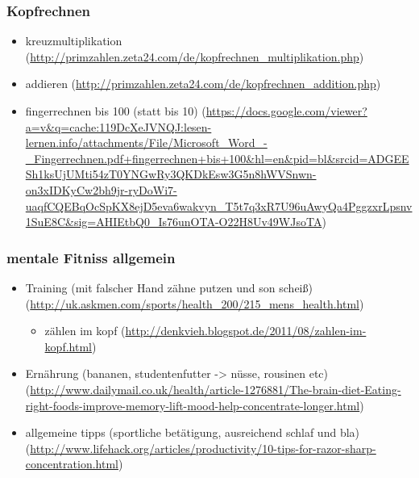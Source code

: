 \documentclass[11pt]{article}
\begin{document}
\subsubsection{Kopfrechnen}
\label{sec-2-3-5}

\begin{itemize}
\item kreuzmultiplikation (\href{http://primzahlen.zeta24.com/de/kopfrechnen_multiplikation.php}{http://primzahlen.zeta24.com/de/kopfrechnen\_multiplikation.php})
\item addieren (\href{http://primzahlen.zeta24.com/de/kopfrechnen_addition.php}{http://primzahlen.zeta24.com/de/kopfrechnen\_addition.php})
\item fingerrechnen bis 100 (statt bis 10) (\href{https://docs.google.com/viewer?a=v&q=cache:119DcXeJVNQJ:lesen-lernen.info/attachments/File/Microsoft_Word_-_Fingerrechnen.pdf+fingerrechnen+bis+100&hl=en&pid=bl&srcid=ADGEESh1ksUjUMti54zT0YNGwRy3QKDkEsw3G5n8hWVSnwn-on3xIDKyCw2bh9jr-ryDoWi7-uaqfCQEBqOcSpKX8ejD5eva6wakvyn_T5t7q3xR7U96uAwyQa4PggzxrLpsnv1SuE8C&sig=AHIEtbQ0_Is76unOTA-O22H8Uv49WJsoTA}{https://docs.google.com/viewer?a=v\&q=cache:119DcXeJVNQJ:lesen-lernen.info/attachments/File/Microsoft\_Word\_-\_Fingerrechnen.pdf+fingerrechnen+bis+100\&hl=en\&pid=bl\&srcid=ADGEESh1ksUjUMti54zT0YNGwRy3QKDkEsw3G5n8hWVSnwn-on3xIDKyCw2bh9jr-ryDoWi7-uaqfCQEBqOcSpKX8ejD5eva6wakvyn\_T5t7q3xR7U96uAwyQa4PggzxrLpsnv1SuE8C\&sig=AHIEtbQ0\_Is76unOTA-O22H8Uv49WJsoTA})
\end{itemize}
\subsubsection{mentale Fitniss allgemein}
\label{sec-2-3-6}

\begin{itemize}
\item Training (mit falscher Hand zähne putzen und son scheiß)(\href{http://uk.askmen.com/sports/health_200/215_mens_health.html}{http://uk.askmen.com/sports/health\_200/215\_mens\_health.html})
\begin{itemize}
\item zählen im kopf (\href{http://denkvieh.blogspot.de/2011/08/zahlen-im-kopf.html}{http://denkvieh.blogspot.de/2011/08/zahlen-im-kopf.html})
\end{itemize}
\item Ernährung (bananen, studentenfutter -> nüsse, rousinen etc)(\href{http://www.dailymail.co.uk/health/article-1276881/The-brain-diet-Eating-right-foods-improve-memory-lift-mood-help-concentrate-longer.html}{http://www.dailymail.co.uk/health/article-1276881/The-brain-diet-Eating-right-foods-improve-memory-lift-mood-help-concentrate-longer.html})
\item allgemeine tipps (sportliche betätigung, ausreichend schlaf und bla) (\href{http://www.lifehack.org/articles/productivity/10-tips-for-razor-sharp-concentration.html}{http://www.lifehack.org/articles/productivity/10-tips-for-razor-sharp-concentration.html})
\end{itemize}
\end{document}
